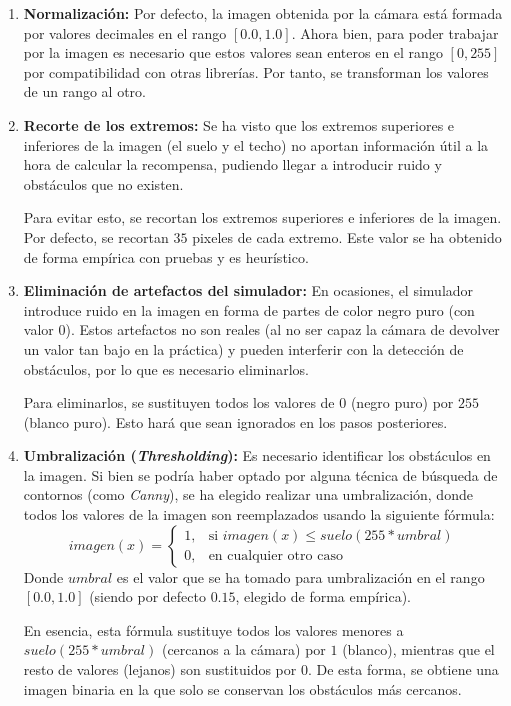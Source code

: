 \begin{enumerate}
	\item \textbf{Normalización:} Por defecto, la imagen obtenida por la cámara está formada por valores decimales en el rango $[0.0, 1.0]$. Ahora bien, para poder trabajar por la imagen es necesario que estos valores sean enteros en el rango $[0, 255]$ por compatibilidad con otras librerías. Por tanto, se transforman los valores de un rango al otro.
	\item \textbf{Recorte de los extremos:} Se ha visto que los extremos superiores e inferiores de la imagen (el suelo y el techo) no aportan información útil a la hora de calcular la recompensa, pudiendo llegar a introducir ruido y obstáculos que no existen.
	
	Para evitar esto, se recortan los extremos superiores e inferiores de la imagen. Por defecto, se recortan $35$ pixeles de cada extremo. Este valor se ha obtenido de forma empírica con pruebas y es heurístico.
	\item \textbf{Eliminación de artefactos del simulador:} En ocasiones, el simulador introduce ruido en la imagen en forma de partes de color negro puro (con valor $0$). Estos artefactos no son reales (al no ser capaz la cámara de devolver un valor tan bajo en la práctica) y pueden interferir con la detección de obstáculos, por lo que es necesario eliminarlos.
	
	Para eliminarlos, se sustituyen todos los valores de $0$ (negro puro) por $255$ (blanco puro). Esto hará que sean ignorados en los pasos posteriores.
	
	\item \textbf{Umbralización (\textit{Thresholding}):} Es necesario identificar los obstáculos en la imagen. Si bien se podría haber optado por alguna técnica de búsqueda de contornos (como \textit{Canny}), se ha elegido realizar una umbralización, donde todos los valores de la imagen son reemplazados usando la siguiente fórmula:
	\[
		imagen(x) = 
		\begin{cases}
			1,& \text{si } imagen(x) \leq suelo(255*umbral)\\
			0,& \text{en cualquier otro caso} 
		\end{cases}
	\] 
	Donde $umbral$ es el valor que se ha tomado para umbralización en el rango $[0.0, 1.0]$ (siendo por defecto $0.15$, elegido de forma empírica).
	
	En esencia, esta fórmula sustituye todos los valores menores a $suelo(255*umbral)$ (cercanos a la cámara) por $1$ (blanco), mientras que el resto de valores (lejanos) son sustituidos por $0$. De esta forma, se obtiene una imagen binaria en la que solo se conservan los obstáculos más cercanos.
	

\end{enumerate}
